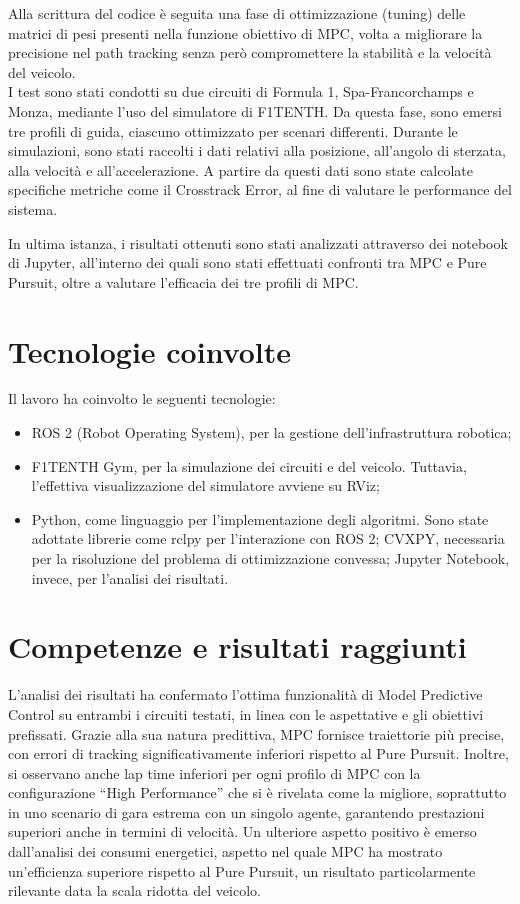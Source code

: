 \documentclass[12pt,a4paper]{article}
\begin{document}
\medskip
\noindent 
Alla scrittura del codice è seguita una fase di ottimizzazione (tuning) delle matrici di 
pesi presenti nella funzione obiettivo di MPC, volta a migliorare la precisione nel path tracking 
senza però compromettere la stabilità e la velocità del veicolo. \\
I test sono stati condotti su due circuiti di Formula 1, Spa-Francorchamps e Monza, mediante l'uso del simulatore di F1TENTH. Da questa fase, sono emersi tre profili di guida, ciascuno ottimizzato per scenari differenti.
Durante le simulazioni, sono stati raccolti i dati relativi alla posizione, all'angolo di sterzata, alla velocità e all'accelerazione. A partire da questi dati sono state
calcolate specifiche metriche come il Crosstrack Error, al fine di valutare le performance del sistema. 

\medskip
\noindent In ultima istanza, i risultati ottenuti sono stati analizzati attraverso dei notebook di Jupyter, all'interno dei quali sono stati effettuati confronti tra MPC e Pure Pursuit, oltre a valutare l'efficacia dei tre profili di MPC.
\section{Tecnologie coinvolte}
Il lavoro ha coinvolto le seguenti tecnologie:
\begin{itemize}
    \item ROS 2 (Robot Operating System), per la gestione dell'infrastruttura robotica;
    \item F1TENTH Gym, per la simulazione dei circuiti e del veicolo. Tuttavia, l'effettiva visualizzazione del simulatore avviene su RViz;
    \item Python, come linguaggio per l'implementazione degli algoritmi. Sono state adottate librerie come rclpy 
    per l'interazione con ROS 2; CVXPY, necessaria per la risoluzione del problema di ottimizzazione convessa; Jupyter Notebook, invece, per l'analisi dei risultati.
\end{itemize}

\section{Competenze e risultati raggiunti}
L'analisi dei risultati ha confermato l'ottima funzionalità di Model Predictive Control su entrambi
i circuiti testati, in linea con le aspettative e gli obiettivi prefissati. Grazie alla sua natura 
predittiva, MPC fornisce traiettorie più precise, con errori di tracking significativamente inferiori 
rispetto al Pure Pursuit. Inoltre, si osservano anche lap time inferiori per ogni profilo di MPC 
con la configurazione ``High Performance'' che si è rivelata come la migliore, soprattutto in uno 
scenario di gara estrema con un singolo agente, garantendo prestazioni superiori anche in termini di velocità.
Un ulteriore aspetto positivo è emerso dall'analisi dei consumi energetici, aspetto nel quale MPC ha mostrato 
un'efficienza superiore rispetto al Pure Pursuit, un risultato particolarmente rilevante data la 
scala ridotta del veicolo.
\end{document}
